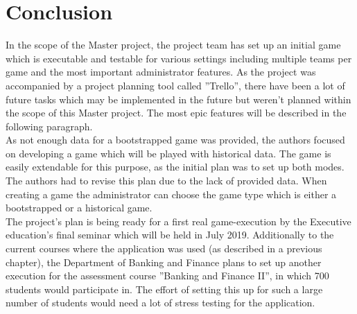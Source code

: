 \section{Conclusion}
In the scope of the Master project, the project team has set up an initial game which is executable and testable for various settings including multiple teams per game and the most important administrator features. As the project was accompanied by a project planning tool called ''Trello'', there have been a lot of future tasks which may be implemented in the future but weren't planned within the scope of this Master project. The most epic features will be described in the following paragraph. \\

As not enough data for a bootstrapped game was provided, the authors focused on developing a game which will be played with historical data. The game is easily extendable for this purpose, as the initial plan was to set up both modes. The authors had to revise this plan due to the lack of provided data. When creating a game the administrator can choose the game type which is either a bootstrapped or a historical game. \\


The project's plan is being ready for a first real game-execution by the Executive education's final seminar which will be held in July 2019. Additionally to the current courses where the application was used (as described in a previous chapter), the Department of Banking and Finance plans to set up another execution for the assessment course ''Banking and Finance II'', in which 700 students would participate in. The effort of setting this up for such a large number of students would need a lot of stress testing for the application.
